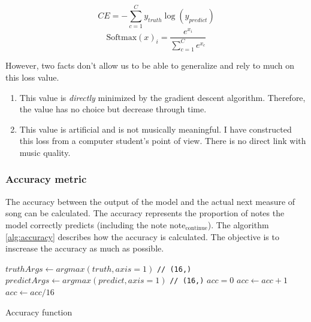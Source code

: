 \documentclass[12pt]{report}
\begin{document}
\begin{equation}
    CE = - \sum_{c=1}^{C} y_{truth} \log(y_{predict})
    \label{eq:ce}
\end{equation}
\begin{equation}
    \text{Softmax}(x)_{i} = \frac{e^{x_i}}{\sum_{c=1}^{C} e^{x_{c}}}
    \label{eq:softmax}
\end{equation}

However, two facts don't allow us to be able to generalize and rely to much on this loss value.
\begin{enumerate}
    \item This value is \textit{directly} minimized by the gradient descent algorithm.
    Therefore, the value has no choice but decrease through time.
    \item This value is artificial and is not musically meaningful.
    I have constructed this loss from a computer student's point of view.
    There is no direct link with music quality.
\end{enumerate}

\subsubsection{Accuracy metric}

The accuracy between the output of the model and the actual next measure of song can be calculated.
The accuracy represents the proportion of notes the model correctly predicts (including the note $\text{note}_{\text{continue}}$).
The algorithm \ref{alg:accuracy} describes how the accuracy is calculated.
The objective is to inscrease the accuracy as much as possible.

\begin{algorithm}
    \begin{algorithmic}[1]
        \Statex
            \State $truthArgs \gets argmax(truth, axis=1)$ \texttt{// (16,)}
            \State $predictArgs \gets argmax(predict, axis=1)$ \texttt{// (16,)}
            \State $acc = 0$
                    \State $acc \gets acc + 1$
                \EndIf
            \EndFor
            \State $acc \gets acc / 16$
            \State {}
        \EndFunction
        \end{algorithmic}
    \caption{Accuracy function}
    \label{alg:accuracy}
\end{algorithm}
\end{document}
